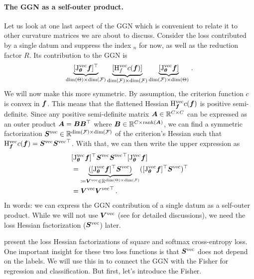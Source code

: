 \paragraph{The GGN as a self-outer product.}
Let us look at one last aspect of the GGN which is convenient to relate it to other curvature matrices we are about to discuss.
Consider the loss contributed by a single datum and suppress the index $_n$ for now, as well as the reduction factor $R$.
Its contribution to the GGN is
\begin{align*}
  \underbrace{[\mathrm{J}_{{\bm{\theta}}}^{\operatorname{vec}} {\bm{f}}]^{\top}}_{\dim(\Theta) \times \dim({\mathcal{F}})}
  \underbrace{[\mathrm{H}^{\operatorname{vec}}_{f} c({\bm{f}})]}_{\dim({\mathcal{F}}) \times \dim({\mathcal{F}})}
  \underbrace{[\mathrm{J}_{{\bm{\theta}}}^{\operatorname{vec}} {\bm{f}}]}_{\dim({\mathcal{F}}) \times \dim(\Theta)}\,.
\end{align*}
We will now make this more symmetric.
By assumption, the criterion function $c$ is convex in ${\bm{f}}$.
This means that the flattened Hessian $\mathrm{H}^{\operatorname{vec}}_{{\bm{f}}} c({\bm{f}})$ is positive semi-definite.
Since any positive semi-definite matrix ${\bm{A}} \in {\mathbb{R}}^{C \times C}$ can be expressed as an outer product ${\bm{A}} = {\bm{B}} {\bm{B}}^{\top}$ where ${\bm{B}} \in {\mathbb{R}}^{C \times \operatorname{rank}({\bm{A}})}$, we can find a symmetric factorization ${\bm{S}}^{\operatorname{vec}} \in {\mathbb{R}}^{\dim({\mathcal{F}}) \times \dim({\mathcal{F}})}$ of the criterion's Hessian such that $\mathrm{H}^{\operatorname{vec}}_{{\bm{f}}} c({\bm{f}}) = {\bm{S}}^{\operatorname{vec}} {{\bm{S}}^{\operatorname{vec}}}^{\top}$.
With that, we can then write the upper expression as
\begin{align*}
  &[\mathrm{J}_{{\bm{\theta}}}^{\operatorname{vec}} {\bm{f}}]^{\top} {\bm{S}}^{\operatorname{vec}} {{\bm{S}}^{\operatorname{vec}}}^{\top} [\mathrm{J}_{{\bm{\theta}}}^{\operatorname{vec}} {\bm{f}}]
  \\
  &=
    \underbrace{([\mathrm{J}_{{\bm{\theta}}}^{\operatorname{vec}} {\bm{f}}]^{\top} {\bm{S}}^{\operatorname{vec}})}_{\coloneq {\bm{V}}^{\operatorname{vec}} \in {\mathbb{R}}^{\dim(\Theta) \times \dim({\mathcal{F}})}}
    ([\mathrm{J}_{{\bm{\theta}}}^{\operatorname{vec}} {\bm{f}}]^{\top} {\bm{S}}^{\operatorname{vec}})^{\top}
  \\
  &=
    {\bm{V}}^{\operatorname{vec}} {{\bm{V}}^{\operatorname{vec}}}^{\top}\,.
\end{align*}
In words: we can express the GGN contribution of a single datum as a self-outer product.
While we will not use ${\bm{V}}^{\operatorname{vec}}$ (see \eg \citet{dangel2022vivit,ren2019efficient} for detailed discussions), we need the loss Hessian factorization (${\bm{S}}^{\operatorname{vec}}$) later.

 present the loss Hessian factorizations of square and softmax cross-entropy loss.
One important insight for these two loss functions is that ${\bm{S}}^{\operatorname{vec}}$ does not depend on the labels.
We will use this in  to connect the GGN with the Fisher for regression and classification.
But first, let's introduce the Fisher.

